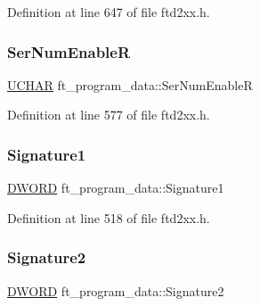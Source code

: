 Definition at line 647 of file ftd2xx.\+h.

\mbox{\label{structft__program__data_ae793566abd42704cd6bdf04b77c84f73}} 
\subsubsection{\texorpdfstring{Ser\+Num\+EnableR}{SerNumEnableR}}
{\footnotesize\ttfamily \hyperlink{CatCaloProto40MHz_2inc_2WinTypes_8h_a4f4bb67531a9bf6f0b9c6ad76aeba587}{U\+C\+H\+AR} ft\+\_\+program\+\_\+data\+::\+Ser\+Num\+EnableR}



Definition at line 577 of file ftd2xx.\+h.

\mbox{\label{structft__program__data_a6b26e04c691ec5944d2fffec797c399a}} 
\subsubsection{\texorpdfstring{Signature1}{Signature1}}
{\footnotesize\ttfamily \hyperlink{CatCaloProto40MHz_2inc_2WinTypes_8h_ad342ac907eb044443153a22f964bf0af}{D\+W\+O\+RD} ft\+\_\+program\+\_\+data\+::\+Signature1}



Definition at line 518 of file ftd2xx.\+h.

\mbox{\label{structft__program__data_ab28a0f4509093050f1927f1e946f3d9f}} 
\subsubsection{\texorpdfstring{Signature2}{Signature2}}
{\footnotesize\ttfamily \hyperlink{CatCaloProto40MHz_2inc_2WinTypes_8h_ad342ac907eb044443153a22f964bf0af}{D\+W\+O\+RD} ft\+\_\+program\+\_\+data\+::\+Signature2}



